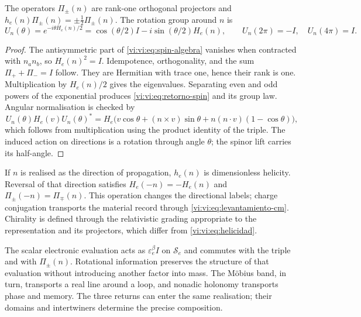 \begin{proposition}
\label{vi:vi:prop:helicidad}
The operators $\Pi_\pm(n)$ are rank-one orthogonal
projectors and $h_e(n)\Pi_\pm(n)=\pm\tfrac12\Pi_\pm(n)$.
The rotation group around $n$ is
\begin{equation}
 U_n(\theta)=e^{-i\theta H_e(n)/2}
 =\cos(\theta/2)I-i\sin(\theta/2)H_e(n),\qquad
 U_n(2\pi)=-I,\quad U_n(4\pi)=I.
 \label{vi:vi:eq:retorno-spin}
\end{equation}
\end{proposition}
\begin{proof}
The antisymmetric part of \eqref{vi:vi:eq:spin-algebra} vanishes
when contracted with $n_an_b$, so $H_e(n)^2=I$.
Idempotence, orthogonality, and the sum
$\Pi_++\Pi_-=I$ follow. They are Hermitian with trace one, hence their
rank is one. Multiplication by $H_e(n)/2$ gives the eigenvalues.
Separating even and odd powers of the exponential produces
\eqref{vi:vi:eq:retorno-spin} and its group law. Angular normalisation
is checked by
\[
 U_n(\theta)H_e(v)U_n(\theta)^*
 =H_e\bigl(v\cos\theta+(n\times v)\sin\theta
       +n(n\cdot v)(1-\cos\theta)\bigr),
\]
which follows from multiplication using the product identity of the
triple. The induced action on directions is a rotation through
angle $\theta$; the spinor lift carries its half-angle.
\end{proof}

If $n$ is realised as the direction of propagation, $h_e(n)$ is
dimensionless helicity. Reversal of that direction satisfies
$H_e(-n)=-H_e(n)$ and $\Pi_\pm(-n)=\Pi_\mp(n)$.
This operation changes the directional labels; charge conjugation
transports the material record through
\eqref{vi:vi:eq:levantamiento-cm}. Chirality is defined through
the relativistic grading appropriate to the representation and
its projectors, which differ from \eqref{vi:vi:eq:helicidad}.

The scalar electronic evaluation acts as
$\varepsilon_e^\beta I$ on $\mathscr S_e$ and commutes with
the triple and with $\Pi_\pm(n)$. Rotational information preserves
the structure of that evaluation without introducing another factor into
mass. The Möbius band, in turn, transports a real
line around a loop, and nonadic holonomy transports
phase and memory. The three returns can enter the same
realisation; their domains and intertwiners determine the
precise composition.

